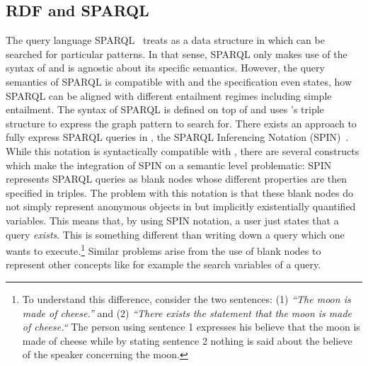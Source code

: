 \subsection{RDF and SPARQL}
The query language SPARQL~\cite{sparql} treats \rdf as a data structure in which can be searched for particular patterns. In that sense, SPARQL only makes use of the syntax of \rdf and 
is agnostic about its specific semantics. However, the query semantics of SPARQL is compatible with \rdf and the specification even states, how SPARQL can be aligned with different 
entailment regimes including simple \rdf entailment.  The syntax of SPARQL is defined on top of \rdf and uses \rdf's  triple structure to express the graph pattern to search for. 
There exists an approach to fully express SPARQL
queries in \rdf, the SPARQL Inferencing Notation (SPIN)~\cite{spin}. 
While this notation is syntactically compatible with \rdf, there are several constructs which make the integration of SPIN on a semantic level problematic:
SPIN represents SPARQL queries as blank nodes whose different properties are then specified in \rdf triples. The problem with this notation is that these blank nodes do 
not simply represent anonymous objects in \rdf but implicitly existentially quantified variables. This means that, by using SPIN notation, a user just states that a 
query \emph{exists}. This is something different than writing down a query which one wants to execute.\footnote{
To understand this difference, consider the two sentences: (1) \emph{``The moon is made of cheese.''} and (2) \emph{``There exists the statement that the moon is made of cheese.``}
The person using sentence 1 expresses his believe that the moon is made of cheese while by stating sentence 2 nothing is said about the believe of the speaker concerning the moon.
} 
Similar problems arise from the use of blank nodes to represent other concepts like for example the search variables of a query. 


